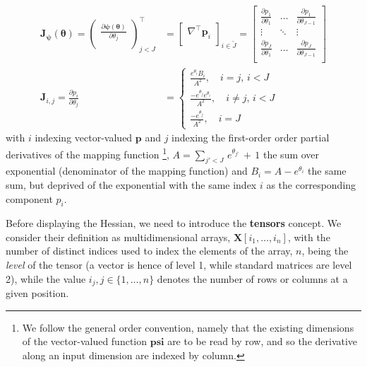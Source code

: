 \documentclass[long, final]{jobim}
\begin{document}
\begin{equation}
\label{eq:mapping-function-gradient}
\begin{aligned}
    \mathbf{J}_{\boldsymbol{\psi}} (\boldsymbol{\theta}) = 
\begin{pmatrix}
\frac{\partial \boldsymbol{\psi}(\boldsymbol{\theta})}{\partial \theta_j} \\
\end{pmatrix}_{j < J }^\top &=
\begin{bmatrix}
\nabla^\top \boldsymbol{p}_i \\
\end{bmatrix}_{i \in \widetilde{J} } = \begin{bmatrix}
\frac{\partial p_1}{\partial \theta_1} & \ldots & \frac{\partial p_1}{\partial \theta_{J-1}}\\
\vdots & \ddots & \vdots \\
\frac{\partial p_J}{\partial \theta_1} & \ldots & \frac{\partial p_J}{\partial \theta_{J-1}}\\
\end{bmatrix}\\  
\mathbf{J}_{i,j} =
   \frac{\partial p_i}{\partial \theta_{j}} &=
\begin{cases}
\frac{e^{\theta_i}B_i}{A^2 },\quad i = j, \, i < J\\
\frac{-e^{\theta_j}e^{\theta_i}}{A^2 }, \quad i \neq j, \, i < J\\
\frac{-e^{\theta_j}}{A^2}, \quad i=J
\end{cases}
  \end{aligned}
\end{equation}
with $i$ indexing vector-valued $\boldsymbol{p}$ and $j$ indexing the first-order order partial derivatives of the mapping function \footnote{We follow the general order convention, namely that the existing dimensions of the vector-valued function $\boldsymbol{psi}$ are to be read by row, and so the derivative along an input dimension are indexed by column.}, $A=\sum_{j' < J} \,e^{\theta_{j'}} \, +  \, 1$ the sum over exponential (denominator of the mapping function) and $B_i=A - e^{\theta_{i}}$ the same sum, but deprived of the exponential with the same index $i$ as the corresponding component $p_i$.

Before displaying the Hessian, we need to introduce the \textbf{tensors} concept. We consider their definition as multidimensional arrays, $\boldsymbol{X}[i_1, \ldots, i_n]$,  with the number of distinct indices used to index the elements of the array, $n$, being the \textit{level} of the tensor (a vector is hence of level 1, while standard matrices are level 2), while the value $i_j, j \in \{1, \ldots, n\}$ denotes the number of rows or columns at a given position. 
\end{document}

